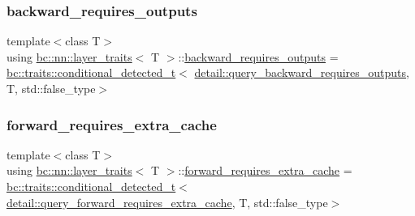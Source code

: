 \subsubsection{\texorpdfstring{backward\+\_\+requires\+\_\+outputs}{backward\_requires\_outputs}}
{\footnotesize\ttfamily template$<$class T$>$ \\
using \hyperlink{structbc_1_1nn_1_1layer__traits}{bc\+::nn\+::layer\+\_\+traits}$<$ T $>$\+::\hyperlink{structbc_1_1nn_1_1layer__traits_adb5ce9f80eb56e874462cf49a02bf2d4}{backward\+\_\+requires\+\_\+outputs} =  \hyperlink{namespacebc_1_1traits_a1a6d378947ec32acd457890854bcd592}{bc\+::traits\+::conditional\+\_\+detected\+\_\+t}$<$ \hyperlink{namespacebc_1_1nn_1_1detail_ad187de638865a7fbfe0e3c1db1511e4a}{detail\+::query\+\_\+backward\+\_\+requires\+\_\+outputs}, T, std\+::false\+\_\+type$>$}

\mbox{\label{structbc_1_1nn_1_1layer__traits_ab46948010fcdbbdf2270619d2644d4a8}} 
\subsubsection{\texorpdfstring{forward\+\_\+requires\+\_\+extra\+\_\+cache}{forward\_requires\_extra\_cache}}
{\footnotesize\ttfamily template$<$class T$>$ \\
using \hyperlink{structbc_1_1nn_1_1layer__traits}{bc\+::nn\+::layer\+\_\+traits}$<$ T $>$\+::\hyperlink{structbc_1_1nn_1_1layer__traits_ab46948010fcdbbdf2270619d2644d4a8}{forward\+\_\+requires\+\_\+extra\+\_\+cache} =  \hyperlink{namespacebc_1_1traits_a1a6d378947ec32acd457890854bcd592}{bc\+::traits\+::conditional\+\_\+detected\+\_\+t}$<$ \hyperlink{namespacebc_1_1nn_1_1detail_a51767bf55cf9cdf8cdff0f2929304390}{detail\+::query\+\_\+forward\+\_\+requires\+\_\+extra\+\_\+cache}, T, std\+::false\+\_\+type$>$}

\mbox{\label{structbc_1_1nn_1_1layer__traits_acc45436e4f0539af616a07204eef707b}} 

